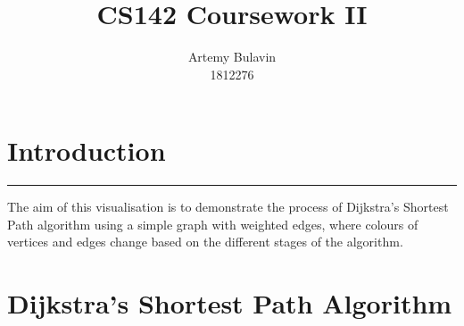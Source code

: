 \documentclass[11pt,a4paper]{article}
\title{\textbf{CS142 Coursework II}}
\author{Artemy Bulavin \\ 1812276}
\date{}
\begin{document}
\maketitle


\section*{Introduction}
\hrule
\vspace{11pt}
The aim of this visualisation is to demonstrate the process of Dijkstra's Shortest Path algorithm using 
a simple graph with weighted edges, where colours of vertices and edges change based on the different stages
of the algorithm.

\section*{Dijkstra's Shortest Path Algorithm}
\end{document}
